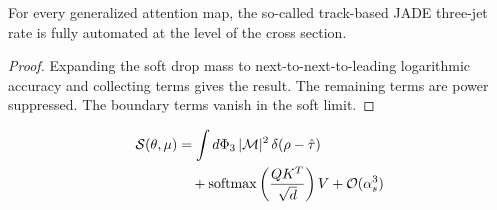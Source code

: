 \begin{lemma}\label{thm:2}
For every generalized attention map, the so-called track-based JADE
three-jet rate is fully automated at the level of the cross section.
\end{lemma}

\begin{proof}
Expanding the soft drop mass to next-to-next-to-leading logarithmic
accuracy and collecting terms gives the result. The remaining terms are
power suppressed. The boundary terms vanish in the soft limit.
\end{proof}

\begin{align}
  \mathcal{S}(\theta, \mu) &= \int d\Phi_{3} \, |\mathcal{M}|^2 \, \delta(\rho - \hat{\tau}) \nonumber \\
  &\quad + \mathrm{softmax}\left(\frac{Q K^T}{\sqrt{d}}\right) V + \mathcal{O}(\alpha_s^3) \label{eq:7}
\end{align}

